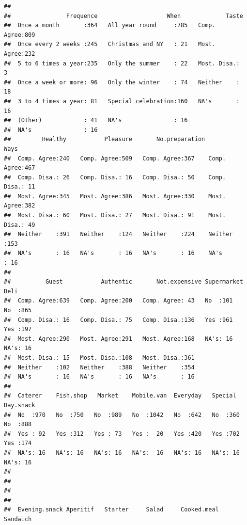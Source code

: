 \documentclass[
]{book}
\begin{document}
\begin{verbatim}
##                                                                         
##                Frequence                    When             Taste    
##  Once a month       :364   All year round     :785   Comp. Agree:809  
##  Once every 2 weeks :245   Christmas and NY   : 21   Most. Agree:232  
##  5 to 6 times a year:235   Only the summer    : 22   Most. Disa.:  3  
##  Once a week or more: 96   Only the winter    : 74   Neither    : 18  
##  3 to 4 times a year: 81   Special celebration:160   NA's       : 16  
##  (Other)            : 41   NA's               : 16                    
##  NA's               : 16                                              
##         Healthy           Pleasure       No.preparation          Ways    
##  Comp. Agree:240   Comp. Agree:509   Comp. Agree:367    Comp. Agree:467  
##  Comp. Disa.: 26   Comp. Disa.: 16   Comp. Disa.: 50    Comp. Disa.: 11  
##  Most. Agree:345   Most. Agree:386   Most. Agree:330    Most. Agree:382  
##  Most. Disa.: 60   Most. Disa.: 27   Most. Disa.: 91    Most. Disa.: 49  
##  Neither    :391   Neither    :124   Neither    :224    Neither    :153  
##  NA's       : 16   NA's       : 16   NA's       : 16    NA's       : 16  
##                                                                          
##          Guest           Authentic       Not.expensive Supermarket   Deli    
##  Comp. Agree:639   Comp. Agree:200   Comp. Agree: 43   No  :101    No  :865  
##  Comp. Disa.: 16   Comp. Disa.: 75   Comp. Disa.:136   Yes :961    Yes :197  
##  Most. Agree:290   Most. Agree:291   Most. Agree:168   NA's: 16    NA's: 16  
##  Most. Disa.: 15   Most. Disa.:108   Most. Disa.:361                         
##  Neither    :102   Neither    :388   Neither    :354                         
##  NA's       : 16   NA's       : 16   NA's       : 16                         
##                                                                              
##  Caterer    Fish.shop   Market    Mobile.van  Everyday   Special    Day.snack 
##  No  :970   No  :750   No  :989   No  :1042   No  :642   No  :360   No  :888  
##  Yes : 92   Yes :312   Yes : 73   Yes :  20   Yes :420   Yes :702   Yes :174  
##  NA's: 16   NA's: 16   NA's: 16   NA's:  16   NA's: 16   NA's: 16   NA's: 16  
##                                                                               
##                                                                               
##                                                                               
##                                                                               
##  Evening.snack Aperitif   Starter     Salad     Cooked.meal Sandwich  

\end{verbatim}
\end{document}
